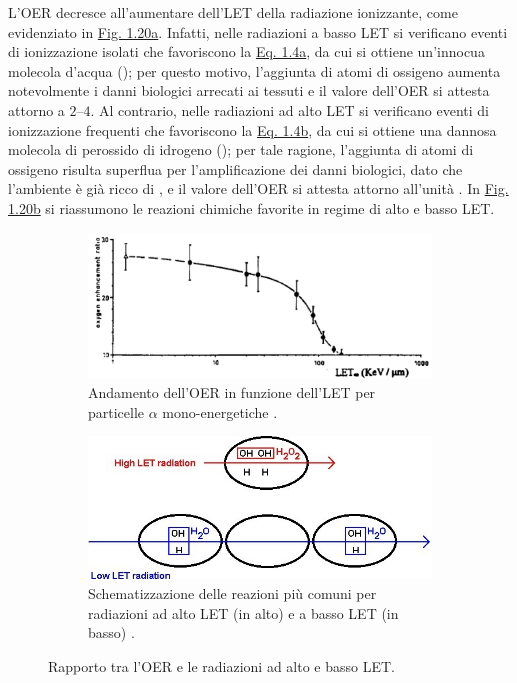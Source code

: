 \documentclass[12pt,a4paper,twoside]{report}
\begin{document}
	L'OER decresce all'aumentare dell'LET della radiazione ionizzante, come evidenziato in \hyperref[fig:let_oer]{Fig. 1.20a}. Infatti, nelle radiazioni a basso LET si verificano eventi di ionizzazione isolati che favoriscono la \hyperref[eq:prodotto1]{Eq. 1.4a}, da cui si ottiene un'innocua molecola d'acqua (); per questo motivo, l'aggiunta di atomi di ossigeno aumenta notevolmente i danni biologici arrecati ai tessuti e il valore dell'OER si attesta attorno a $2$--$4$. Al contrario, nelle radiazioni ad alto LET si verificano eventi di ionizzazione frequenti che favoriscono la \hyperref[eq:prodotto2]{Eq. 1.4b}, da cui si ottiene una dannosa molecola di perossido di idrogeno (); per tale ragione, l'aggiunta di atomi di ossigeno risulta superflua per l'amplificazione dei danni biologici, dato che l'ambiente è già ricco di , e il valore dell'OER si attesta attorno all'unità \cite{BRAHME2014121,Barendsen1994-bx}. In \hyperref[fig:reaction_let]{Fig. 1.20b} si riassumono le reazioni chimiche favorite in regime di alto e basso LET.
	\begin{figure}[H]
		\centering
		\begin{subfigure}[t]{0.49\textwidth}
			\centering
			\includegraphics[width=\textwidth, scale=0.50]{let_rbe2.png}
			\caption{Andamento dell'OER in funzione dell'LET per particelle $\alpha$ mono-energetiche \cite{antib1020124,handbook1}.}
			\label{fig:let_oer}
		\end{subfigure}
		\hfill
		\begin{subfigure}[t]{0.49\textwidth}
			\centering
			\includegraphics[width=\textwidth, scale=0.50]{reaction_let.jpg}
			\caption{Schematizzazione delle reazioni più comuni per radiazioni ad alto LET (in alto) e a basso LET (in basso) \cite{let_si}.}
			\label{fig:reaction_let}
		\end{subfigure}
		\caption{Rapporto tra l'OER e le radiazioni ad alto e basso LET.}
	\end{figure}
\end{document}
